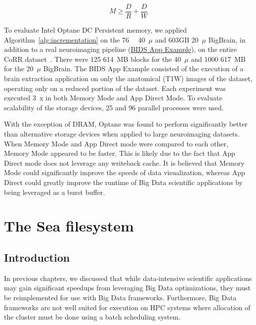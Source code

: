 \documentclass{report}
\begin{document}
        \begin{equation}\label{eq:optane}
            M \ge \frac{D}{R} + \frac{D}{W}
        \end{equation}

         To evaluate Intel Optane DC Persistent memory, we applied 
         Algorithm~\ref{alg:incrementation} on the \SI{76}{\giga\byte} 40~$\mu$ and 603GB
        20~$\mu$ BigBrain, in addition to a real neuroimaging pipeline (\href{https://github.com/BIDS-Apps/example}{BIDS App
        Example}), on the entire CoRR
        dataset~\cite{corr}. There were 125 614~MB blocks for the
        40~$\mu$ and 1000 617~MB for the 20~$\mu$ BigBrain.  The BIDS App
        Example consisted of the execution of a brain extraction application on
        only the anatomical (T1W) images of the dataset, operating only on a
        reduced portion of the dataset. Each experiment was
        executed 3~x in both Memory Mode and App Direct Mode. To evaluate
        scalability of the storage devices, 25 and 96 parallel processes were
        used.

        With the exception of DRAM, Optane was found to perform significantly
        better than alternative storage devices when applied to large neuroimaging
        datasets. When Memory Mode and App Direct mode were compared to each other,
        Memory Mode appeared to be faster. This is likely due to the fact that App
        Direct mode does not leverage any writeback cache. It is believed that Memory
        Mode could significantly improve the speeds of data visualization, whereas App
        Direct could greatly improve the runtime of Big Data scientific applications
        by being leveraged as a burst buffer.



        \chapter{The Sea filesystem}\label{chp:sea}
    \section{Introduction}
    In previous chapters, we discussed that while data-intensive scientific 
    applications may gain significant speedups from leveraging Big Data optimizations,
    they must be reimplemented for use with Big Data frameworks. Furthermore, Big Data
    frameworks are not well suited for execution on HPC systems where allocation of the
    cluster must be done using a batch scheduling system.
\end{document}
